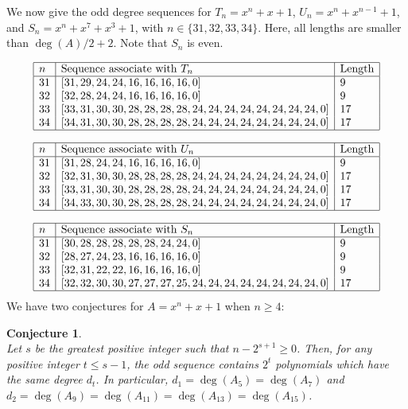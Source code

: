 \documentclass [12pt]{article}
\newtheorem{conjecture}[theorem]{Conjecture}
\begin{document}
We now give the odd degree sequences for $T_n = x^n+x+1$, $U_n = x^n+x^{n-1}+1$, and $S_n= x^n+x^7+x^3+1$, with $n \in \{31,32,33,34\}$. Here, all lengths are smaller than $\deg(A)/2+2$. Note that $S_n$ is even.

$$\begin{array}{|l|l|l|}
\hline
n&\text{Sequence associate with $T_n$}&\text{Length}\\
\hline
31&[31, 29, 24, 24, 16, 16, 16, 16, 0]&9\\
32&[32, 28, 24, 24, 16, 16, 16, 16, 0]&9\\
33&[33, 31, 30, 30, 28, 28, 28, 28, 24, 24, 24, 24, 24, 24, 24, 24, 0]&17\\
34&[34, 31, 30, 30, 28, 28, 28, 28, 24, 24, 24, 24, 24, 24, 24, 24, 0]&17\\
\hline
\end{array}$$

$$\begin{array}{|l|l|l|}
\hline
n&\text{Sequence associate with $U_n$}&\text{Length}\\
\hline
31&[31, 28, 24, 24, 16, 16, 16, 16, 0]&9\\
32&[32, 31, 30, 30, 28, 28, 28, 28, 24, 24, 24, 24, 24, 24, 24, 24, 0]&17\\
33&[33, 31, 30, 30, 28, 28, 28, 28, 24, 24, 24, 24, 24, 24, 24, 24, 0]&17\\
34&[34, 33, 30, 30, 28, 28, 28, 28, 24, 24, 24, 24, 24, 24, 24, 24, 0]&17\\
\hline
\end{array}$$

$$\begin{array}{|l|l|l|}
\hline
n&\text{Sequence associate with $S_n$}&\text{Length}\\
\hline
31&[30, 28, 28, 28, 28, 28, 24, 24, 0]&9\\
32&[28, 27, 24, 23, 16, 16, 16, 16, 0]&9\\
33&[32, 31, 22, 22, 16, 16, 16, 16, 0]&9\\
34&[32, 32, 30, 30, 27, 27, 27, 25, 24, 24, 24, 24, 24, 24, 24, 24, 0]&17\\
\hline
\end{array}$$
We have two conjectures for $A = x^n+x+1$ when $n \geq 4$:

\begin{conjecture} \label{proppartcase}~\\
Let $s$ be the greatest positive integer such that  $n-2^{s+1} \geq 0$. Then, for any positive integer $t \leq s-1$, the odd sequence contains $2^t$ polynomials which have the same degree $d_t$.
In particular, $d_1 = \deg(A_5) = \deg(A_7)$ and  $d_2 = \deg(A_9) = \deg(A_{11}) = \deg(A_{13})=\deg(A_{15})$.
\end{conjecture}
\end{document}
